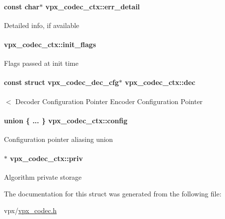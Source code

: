 \paragraph[{\texorpdfstring{err\+\_\+detail}{err_detail}}]{\setlength{\rightskip}{0pt plus 5cm}const char$\ast$ vpx\+\_\+codec\+\_\+ctx\+::err\+\_\+detail}\hypertarget{structvpx__codec__ctx_ad785c88ae862dd9129965c72723260bd}{}\label{structvpx__codec__ctx_ad785c88ae862dd9129965c72723260bd}
Detailed info, if available 
\paragraph[{\texorpdfstring{init\+\_\+flags}{init_flags}}]{ vpx\+\_\+codec\+\_\+ctx\+::init\+\_\+flags}\hypertarget{structvpx__codec__ctx_a76546548086c060a6bd21cb55037fb2b}{}\label{structvpx__codec__ctx_a76546548086c060a6bd21cb55037fb2b}
Flags passed at init time 
\paragraph[{\texorpdfstring{dec}{dec}}]{\setlength{\rightskip}{0pt plus 5cm}const struct {\bf vpx\+\_\+codec\+\_\+dec\+\_\+cfg}$\ast$ vpx\+\_\+codec\+\_\+ctx\+::dec}\hypertarget{structvpx__codec__ctx_a3033c08dd62713d56d875ea51575bd2b}{}\label{structvpx__codec__ctx_a3033c08dd62713d56d875ea51575bd2b}
$<$ Decoder Configuration Pointer Encoder Configuration Pointer 
\paragraph[{\texorpdfstring{config}{config}}]{\setlength{\rightskip}{0pt plus 5cm}union \{ ... \}   vpx\+\_\+codec\+\_\+ctx\+::config}\hypertarget{structvpx__codec__ctx_a3ae36229fb0ec0b537a2b236e6f1b11b}{}\label{structvpx__codec__ctx_a3ae36229fb0ec0b537a2b236e6f1b11b}
Configuration pointer aliasing union 
\paragraph[{\texorpdfstring{priv}{priv}}]{$\ast$ vpx\+\_\+codec\+\_\+ctx\+::priv}\hypertarget{structvpx__codec__ctx_acee775fd5b7580e112e245ce39733f92}{}\label{structvpx__codec__ctx_acee775fd5b7580e112e245ce39733f92}
Algorithm private storage 

The documentation for this struct was generated from the following file\+:\begin{DoxyCompactItemize}
\item 
vpx/\hyperlink{vpx__codec_8h}{vpx\+\_\+codec.\+h}\end{DoxyCompactItemize}
